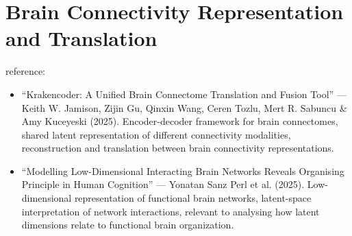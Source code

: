 \section{Brain Connectivity Representation and Translation}

reference:
\begin{itemize}
    \item “Krakencoder: A Unified Brain Connectome Translation and Fusion Tool” — Keith W. Jamison, Zijin Gu, Qinxin Wang, Ceren Tozlu, Mert R. Sabuncu \& Amy Kuceyeski (2025). Encoder-decoder framework for brain connectomes, shared latent representation of different connectivity modalities, reconstruction and translation between brain connectivity representations.
    \item “Modelling Low-Dimensional Interacting Brain Networks Reveals Organising Principle in Human Cognition” — Yonatan Sanz Perl et al. (2025). Low-dimensional representation of functional brain networks, latent-space interpretation of network interactions, relevant to analysing how latent dimensions relate to functional brain organization.
\end{itemize}
